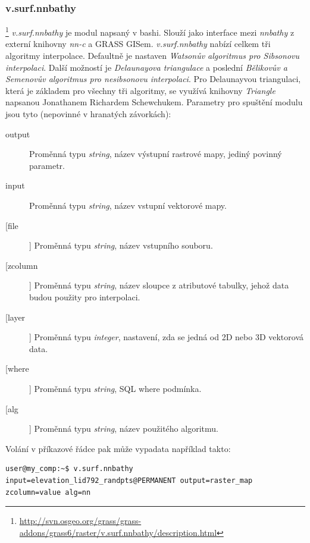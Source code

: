 \documentclass[12pt,a4paper]{article}
\begin{document}
\subsubsection{v.surf.nnbathy}\footnote{\url{http://svn.osgeo.org/grass/grass-addons/grass6/raster/v.surf.nnbathy/description.html}}
\emph{v.surf.nnbathy} je modul napsaný v bashi. Slouží jako interface mezi \emph{nnbathy} z externí knihovny \emph{nn-c} a GRASS GISem. \emph{v.surf.nnbathy} nabízí celkem tři algoritmy interpolace. Defaultně je nastaven \emph{Watsonův algoritmus 	pro Sibsonovu interpolaci}. Další možností je \emph{Delaunayova triangulace} a poslední \emph{Bělikovův a Semenovův algoritmus pro nesibsonovu interpolaci}. Pro Delaunayvou triangulaci, která je základem pro všechny tři algoritmy, se využívá knihovny \emph{Triangle} napsanou Jonathanem Richardem Schewchukem. Parametry pro spuštění modulu jsou tyto (nepovinné v hranatých závorkách):
\begin{description}
\item[output] Proměnná typu \emph{string}, název výstupní rastrové mapy, jediný povinný parametr.
\item[input] Proměnná typu \emph{string}, název vstupní vektorové mapy.
\item[[file]] Proměnná typu \emph{string}, název vstupního souboru.
\item[[zcolumn]] Proměnná typu \emph{string}, název sloupce z atributové tabulky, jehož data budou použity pro interpolaci.
\item[[layer]] Proměnná typu \emph{integer}, nastavení, zda se jedná od 2D nebo 3D vektorová data.
\item[[where]] Proměnná typu \emph{string}, SQL where podmínka.
\item[[alg]] Proměnná typu \emph{string}, název použitého algoritmu.
\end{description}

\bigskip
{}

Volání v příkazové řádce pak může vypadata například takto:
\begin{lstlisting}[caption={bash version}]
user@my_comp:~$ v.surf.nnbathy input=elevation_lid792_randpts@PERMANENT output=raster_map zcolumn=value alg=nn
\end{lstlisting}
\end{document}
